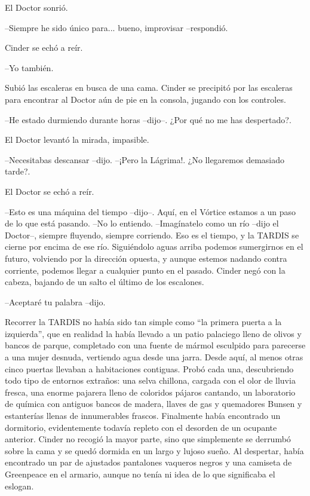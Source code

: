 El Doctor sonrió. 

--Siempre he sido único para... bueno, improvisar --respondió.

Cinder se echó a reír. 

--Yo también.

Subió las escaleras en busca de una cama.
Cinder se precipitó por las escaleras para encontrar al Doctor aún de pie en la consola, jugando con los controles. 

--He estado durmiendo durante horas --dijo--. ¿Por qué no me has despertado?.

El Doctor levantó la mirada, impasible. 

--Necesitabas descansar --dijo.
--¡Pero la Lágrima!. ¿No llegaremos demasiado tarde?.

El Doctor se echó a reír. 

--Esto es una máquina del tiempo --dijo--. Aquí, en el Vórtice estamos a un paso de lo que está pasando.
--No lo entiendo.
--Imagínatelo como un río --dijo el Doctor--, siempre fluyendo, siempre corriendo. Eso es el tiempo, y la TARDIS se cierne por encima de ese río. Siguiéndolo aguas arriba podemos sumergirnos en el futuro, volviendo por la dirección opuesta, y aunque estemos nadando contra corriente, podemos llegar a cualquier punto en el pasado.
Cinder negó con la cabeza, bajando de un salto el último de los escalones. 

--Aceptaré tu palabra --dijo.

Recorrer la TARDIS no había sido tan simple como ``la primera puerta a la izquierda'', que en realidad la había llevado a un patio palaciego lleno de olivos y bancos de parque, completado con una fuente de mármol esculpido para parecerse a una mujer desnuda, vertiendo agua desde una jarra. Desde aquí, al menos otras cinco puertas llevaban a habitaciones contiguas. Probó cada una, descubriendo todo tipo de entornos extraños: una selva chillona, cargada con el olor de lluvia fresca, una enorme pajarera lleno de coloridos pájaros cantando, un laboratorio de química con antiguos bancos de madera, llaves de gas y quemadores Bunsen y estanterías llenas de innumerables frascos. Finalmente había encontrado un dormitorio, evidentemente todavía repleto con el desorden de un ocupante anterior. Cinder no recogió la mayor parte, sino que simplemente se derrumbó sobre la cama y se quedó dormida en un largo y lujoso sueño.
Al despertar, había encontrado un par de ajustados pantalones vaqueros negros y una camiseta de Greenpeace en el armario, aunque no tenía ni idea de lo que significaba el eslogan.

